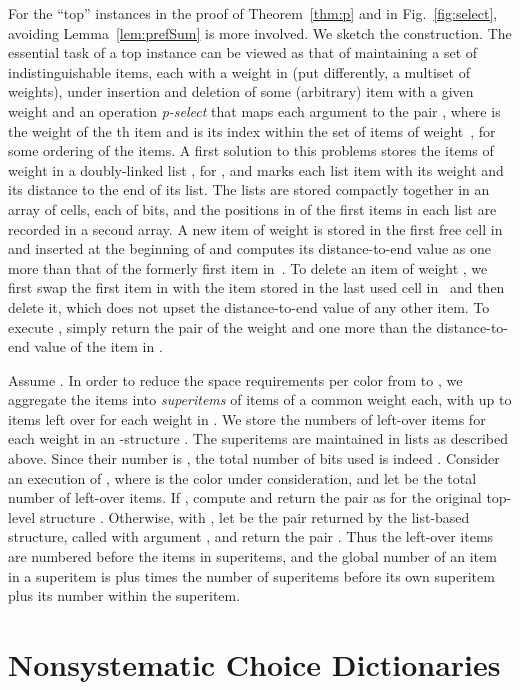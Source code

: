 \documentclass[envcountsame,envcountsect,undated,nolinenumbers]{lnthi}
\def\Tvn#1{\hbox{\textit{#1\/}}}
\begin{document}
For the ``top'' instances  in the proof of
Theorem~\ref{thm:p} and in Fig.~\ref{fig:select},
avoiding Lemma~\ref{lem:prefSum} is more involved.
We sketch the construction.
The essential task of a top instance
 can be viewed as that of
maintaining a set of  indistinguishable
items, each with a weight in 
(put differently, a multiset of weights),
under insertion and deletion of some (arbitrary) item
with a given weight and
an operation \Tvn{p-select} that maps each argument
 to the pair ,
where  is the weight of the
th item and  is its index 
within the set of items of weight~,
for some ordering of the items.
A first solution to this problems stores the
items of weight  in a doubly-linked list ,
for , and marks each list item
with its weight and
its distance to the end of its list.
The  lists are stored compactly together in an
array  of  cells, each of  bits,
and the positions in  of the first items in each list
are recorded in a second array.
A new item of weight 
is stored in the first free cell in~
and inserted at the beginning of 
and computes its distance-to-end value
as one more than that
of the formerly first item in~.
To delete an item of weight ,
we first swap the first item in  with the
item stored in the last used cell in~
and then delete it,
which does not upset
the distance-to-end value of any other item.
To execute , simply return
the pair of
the weight and one more than the distance-to-end value of the
item in .

Assume .
In order to reduce the space requirements
per color
from  to ,
we aggregate the  items into \emph{superitems}
of  items of a common weight each, with up to  items
left over for each weight in .
We store the numbers of left-over items
for each weight in an
-structure .
The superitems are maintained in  lists
as described above.
Since their number is , the total
number of bits used is indeed .
Consider an execution of ,
where  is the color under consideration,
and let 
be the total number of left-over items.
If ,
compute 
and return the pair
 as for the original
top-level structure .
Otherwise, with ,
let  be the
pair returned by the list-based structure,
called with argument ,
and return the pair .
Thus the left-over items are numbered before
the items in superitems, and the global number of
an item in a superitem is  plus  times the
number of superitems before
its own superitem plus its number
within the superitem.

\section{Nonsystematic Choice Dictionaries}
\label{sec:nonsystematic}
\end{document}
